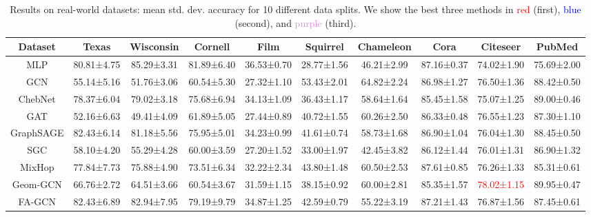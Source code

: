 \documentclass{article}
\theoremstyle{plain}
\theoremstyle{definition}
\theoremstyle{remark}
\newcommand{\std}{\scriptsize{}}
\newcommand{\BEST}[1]{\textcolor{red}{#1}}
\newcommand{\SECOND}[1]{\textcolor{blue}{#1}}
\newcommand{\THIRD}[1]{\textcolor{violet}{#1}}
\begin{document}
\begin{table}[ht]
    \small
    \centering
    \setlength{\tabcolsep}{2pt}
    \caption{Results on real-world datasets: mean  std. dev. accuracy for 10 different data splits. We show the best three methods in \BEST{red} (first), \SECOND{blue} (second), and \THIRD{purple} (third).}
\begin{tabular}{c ccccccccc}\toprule
        Dataset     & Texas      & Wisconsin  & Cornell    & Film       & Squirrel   & Chameleon  & Cora       & Citeseer   & PubMed\\ \midrule
        MLP	        & 80.81\std{±4.75} & 85.29\std{±3.31} & 81.89\std{±6.40} & 36.53\std{±0.70} & 28.77\std{±1.56} & 46.21\std{±2.99} & 87.16\std{±0.37} & 74.02\std{±1.90} & 75.69\std{±2.00}\\
        \midrule
        GCN	        & 55.14\std{±5.16} & 51.76\std{±3.06} & 60.54\std{±5.30} & 27.32\std{±1.10} & 53.43\std{±2.01} & 64.82\std{±2.24} & 86.98\std{±1.27} & 76.50\std{±1.36} & 88.42\std{±0.50}\\
        ChebNet     & 78.37\std{±6.04} & 79.02\std{±3.18} & 75.68\std{±6.94} & 34.13\std{±1.09}	& 36.43\std{±1.17} & 58.64\std{±1.64} & 85.45\std{±1.58} & 75.07\std{±1.25}	& 89.00\std{±0.46}\\
        GAT	        & 52.16\std{±6.63} & 49.41\std{±4.09} & 61.89\std{±5.05} & 27.44\std{±0.89} & 40.72\std{±1.55} & 60.26\std{±2.50} & 86.33\std{±0.48} & 76.55\std{±1.23} & 87.30\std{±1.10}\\
        GraphSAGE	& 82.43\std{±6.14} & 81.18\std{±5.56} & 75.95\std{±5.01} & 34.23\std{±0.99} & 41.61\std{±0.74} & 58.73\std{±1.68} & 86.90\std{±1.04} & 76.04\std{±1.30} & 88.45\std{±0.50}\\
        SGC         & 58.10\std{±4.20} & 55.29\std{±4.28} & 60.00\std{±3.59} & 27.20\std{±1.52} & 33.00\std{±1.97} & 42.45\std{±3.82} & 86.12\std{±1.44} & 76.01\std{±1.31} & 86.90\std{±1.32}\\
        \midrule
        MixHop      & 77.84\std{±7.73} & 75.88\std{±4.90} & 73.51\std{±6.34} & 32.22\std{±2.34} & 43.80\std{±1.48} & 60.50\std{±2.53} & 87.61\std{±0.85} & 76.26\std{±1.33}	& 85.31\std{±0.61}\\
        Geom-GCN	& 66.76\std{±2.72} & 64.51\std{±3.66} & 60.54\std{±3.67} & 31.59\std{±1.15} & 38.15\std{±0.92} & 60.00\std{±2.81} & 85.35\std{±1.57} & \BEST{78.02\std{±1.15}} & 89.95\std{±0.47}\\
        FA-GCN      & 82.43\std{±6.89} & 82.94\std{±7.95} & 79.19\std{±9.79} & 34.87\std{±1.25} & 42.59\std{±0.79} & 55.22\std{±3.19} & 87.21\std{±1.43} & 76.87\std{±1.56}	& 87.45\std{±0.61}\\

\end{tabular}
\end{table}
\end{document}
